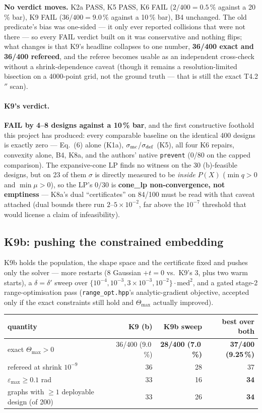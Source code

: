 \documentclass[10pt,a4paper]{article}
\newcommand{\fn}[1]{\nolinkurl{#1}}
\begin{document}
\textbf{No verdict moves.} K2a PASS, K5 PASS, K6 FAIL ($2/400=0.5\,\%$ against a 20\,\% bar), K9
FAIL ($36/400=9.0\,\%$ against a 10\,\% bar), B4 unchanged. The old predicate's bias was
one-sided --- it only ever reported collisions that were not there --- so every FAIL verdict built
on it was conservative and nothing flips; what changes is that K9's headline collapses to one
number, \textbf{36/400 exact and 36/400 refereed}, and the referee becomes usable as an
independent cross-check without a shrink-dependence caveat (though it remains a resolution-limited
bisection on a 4000-point grid, not the ground truth --- that is still the exact T4.2$''$ scan).

\paragraph{K9's verdict.} \textbf{FAIL by 4--8 designs against a 10\,\% bar}, and the first
constructive foothold this project has produced: every comparable baseline on the identical 400
designs is exactly zero --- Eq.~(6) alone (K1a), $\sigma_{\rm mc}$/$\sigma_{\rm def}$ (K5), all
four K6 repairs, convexity alone, B4, K8a, and the authors' native \fn{prevent} (0/80 on the
capped comparison). The expansive-cone LP finds no witness on the 30 (b)-feasible designs, but on
23 of them $\sigma$ is directly measured to be \emph{inside} $P(X)$ ($\min q>0$ and $\min\mu>0$),
so the LP's $0/30$ is \textbf{cone\_lp non-convergence, not emptiness} --- K8a's dual
``certificates'' on 84/100 must be read with that caveat attached (dual bounds there run
$2$--$5\times10^{-2}$, far above the $10^{-7}$ threshold that would license a claim of
infeasibility).

\subsection{K9b: pushing the constrained embedding}
\label{sec:day3-k9b}

K9b holds the population, the shape space and the certificate fixed and pushes only the solver
--- more restarts (8 Gaussian $+ t=0$ vs.\ K9's 3, plus two warm starts), a $\delta=\delta'$
sweep over $\{10^{-4},10^{-3},3\times10^{-3},10^{-2}\}\cdot\mathrm{med}^2$, and a gated stage-2
range-optimisation pass (\fn{range\_opt.hpp}'s analytic-gradient objective, accepted only if the
exact constraints still hold and $\Theta_{\max}$ actually improved).

\begin{table}[h]\centering\small
\begin{tabular}{@{}lrrr@{}}
\toprule
quantity & K9 (b) & K9b sweep & best over both \\
\midrule
exact $\Theta_{\max}>0$ & 36/400 (9.0\,\%) & \textbf{28/400 (7.0\,\%)} & \textbf{37/400 (9.25\,\%)} \\
refereed at shrink $10^{-9}$ & 36 & 28 & 37 \\
$\varepsilon_{\max}\ge0.1$ rad & 33 & 16 & \textbf{34} \\
graphs with $\ge1$ deployable design (of 200) & 33 & 26 & \textbf{34} \\
\bottomrule
\end{tabular}
\end{table}
\end{document}
